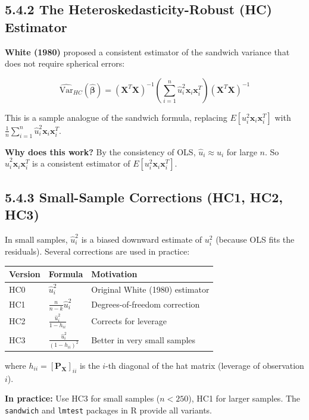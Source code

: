 \subsection{5.4.2 The Heteroskedasticity-Robust (HC) Estimator}

\textbf{White (1980)} proposed a consistent estimator of the sandwich variance that does not require spherical errors:

\[
\widehat{\text{Var}}_{HC}(\hat{\boldsymbol{\beta}}) = (\mathbf{X}^T\mathbf{X})^{-1} \left(\sum_{i=1}^n \hat{u}_i^2 \mathbf{x}_i \mathbf{x}_i^T\right) (\mathbf{X}^T\mathbf{X})^{-1}
\]

This is a sample analogue of the sandwich formula, replacing $E[u_i^2 \mathbf{x}_i \mathbf{x}_i^T]$ with $\frac{1}{n}\sum_{i=1}^n \hat{u}_i^2 \mathbf{x}_i \mathbf{x}_i^T$.

\textbf{Why does this work?} By the consistency of OLS, $\hat{u}_i \approx u_i$ for large $n$. So $\hat{u}_i^2 \mathbf{x}_i \mathbf{x}_i^T$ is a consistent estimator of $E[u_i^2 \mathbf{x}_i \mathbf{x}_i^T]$.

\subsection{5.4.3 Small-Sample Corrections (HC1, HC2, HC3)}

In small samples, $\hat{u}_i^2$ is a biased downward estimate of $u_i^2$ (because OLS fits the residuals). Several corrections are used in practice:

\begin{center}
\begin{tabular}{@{} l l l @{}}
\toprule
\textbf{Version} & \textbf{Formula} & \textbf{Motivation} \\
\midrule
HC0 & $\hat{u}_i^2$ & Original White (1980) estimator \\
HC1 & $\frac{n}{n-k}\hat{u}_i^2$ & Degrees-of-freedom correction \\
HC2 & $\frac{\hat{u}_i^2}{1 - h_{ii}}$ & Corrects for leverage \\
HC3 & $\frac{\hat{u}_i^2}{(1 - h_{ii})^2}$ & Better in very small samples \\
\bottomrule
\end{tabular}
\end{center}

where $h_{ii} = [\mathbf{P_X}]_{ii}$ is the $i$-th diagonal of the hat matrix (leverage of observation $i$).

\textbf{In practice:} Use HC3 for small samples ($n < 250$), HC1 for larger samples. The \texttt{sandwich} and \texttt{lmtest} packages in R provide all variants.

